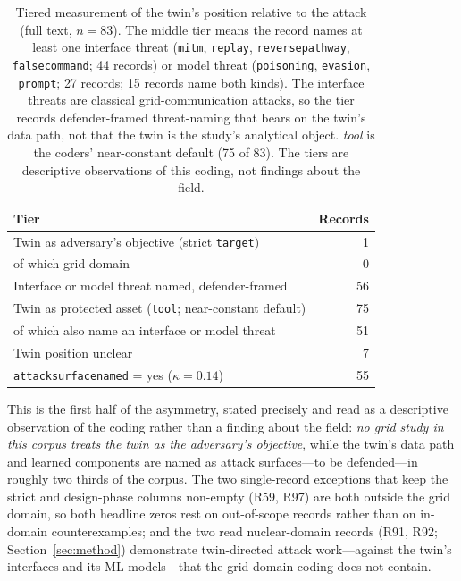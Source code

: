 \documentclass[preprint,12pt]{elsarticle}
\renewcommand{\_}{\plainunderscore\allowbreak}
\begin{document}
\begin{table}[t]
\centering
\caption{Tiered measurement of the twin's position relative to the attack (full text,
$n=83$). The middle tier means the record names at least one interface threat
(\texttt{mitm}, \texttt{replay}, \texttt{reverse\_pathway}, \texttt{false\_command}; 44
records) or model threat (\texttt{poisoning}, \texttt{evasion}, \texttt{prompt}; 27
records; 15 records name both kinds). The interface threats are classical
grid-communication attacks, so the tier records defender-framed threat-naming that bears
on the twin's data path, not that the twin is the study's analytical object. \emph{tool}
is the coders' near-constant default (75 of 83). The tiers are descriptive
observations of this coding, not findings about the field.}
\label{tab:twintiers}
\small
\begin{tabular}{@{}lr@{}}
\toprule
Tier & Records \\
\midrule
Twin as adversary's objective (strict \texttt{target}) & 1 \\
\quad of which grid-domain & 0 \\
Interface or model threat named, defender-framed & 56 \\
Twin as protected asset (\texttt{tool}; near-constant default) & 75 \\
\quad of which also name an interface or model threat & 51 \\
Twin position unclear & 7 \\
\midrule
\texttt{attack\_surface\_named} = yes ($\kappa=0.14$) & 55 \\
\bottomrule
\end{tabular}
\end{table}

This is the first half of the asymmetry, stated precisely and read as a descriptive
observation of the coding rather than a finding about the field: \emph{no grid study in
this corpus treats the twin as the adversary's objective}, while the twin's data path and
learned components are named as attack surfaces---to be defended---in roughly two thirds
of the corpus. The two single-record exceptions that keep the strict and design-phase
columns non-empty (R59, R97) are both outside the grid domain, so both headline zeros
rest on out-of-scope records rather than on in-domain counterexamples; and the two read
nuclear-domain records (R91, R92; Section~\ref{sec:method}) demonstrate twin-directed
attack work---against the twin's interfaces and its ML models---that the grid-domain
coding does not contain.
\end{document}
